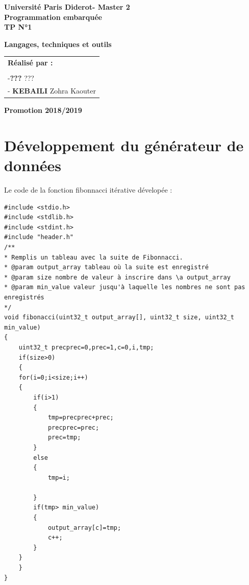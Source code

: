 \documentclass[12pt,a4paper]{article}
\begin{document}
\begin{center}

 
  
 
   \large
  	\vspace{2cm}
  \textbf{Université Paris Diderot- Master 2}\\
  \vspace{1cm}
  \LARGE
  \textbf{Programmation embarquée}\\
   \vspace*{1cm}
\LARGE
  \textbf{TP N°1}
 
  \large
  \LARGE
  \setlength{\fboxsep}{0.5cm}
  \begin{framed}
	\textbf{Langages, techniques et outils}
  \end{framed}
  \vspace{2cm}
\begin{table}[H]
   \setlength{\tabcolsep}{2cm}
    \large
	\centering
	\begin{tabular}{l}
		\textbf{Réalisé par :}    
		 \\  \\
		 -\textbf{???} ???\\
		- \textbf{ KEBAILI } Zohra Kaouter\\
	
	
		
  

	\end{tabular}
  \end{table}
  \vspace{\fill}
  \large
  \textbf{Promotion 2018/2019}
   \end{center}
\newpage
\section{Développement du générateur de données}
Le code de la fonction fibonnacci itérative dévelopée :
\begin{verbatim}
#include <stdio.h>
#include <stdlib.h>
#include <stdint.h>
#include "header.h"
/**
* Remplis un tableau avec la suite de Fibonnacci.
* @param output_array tableau où la suite est enregistré
* @param size nombre de valeur à inscrire dans \a output_array
* @param min_value valeur jusqu'à laquelle les nombres ne sont pas enregistrés
*/
void fibonacci(uint32_t output_array[], uint32_t size, uint32_t min_value)
{
	uint32_t precprec=0,prec=1,c=0,i,tmp;
	if(size>0)
	{
	for(i=0;i<size;i++)
	{
		if(i>1)
		{
			tmp=precprec+prec;
			precprec=prec;
			prec=tmp;
		}
		else
		{
			tmp=i;

		}
		if(tmp> min_value)
		{
			output_array[c]=tmp;
			c++;
		}
	}
	}
}

\end{verbatim}
\end{document}
